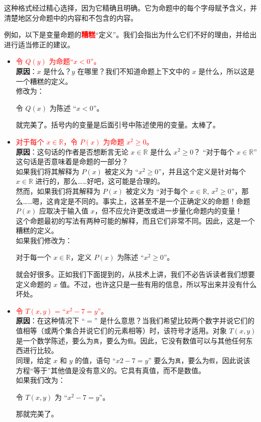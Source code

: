 这种格式经过精心选择，因为它精确且明确。它为命题中的每个字母赋予含义，并清楚地区分命题中的内容和不包含的内容。

例如，以下是变量命题的\textcolor{red}{\textbf{糟糕}}``定义''。我们会指出为什么它们不好的理由，并给出进行适当修正的建议。
\begin{itemize}
    \item \textcolor{red}{令 $Q(y)$ 为命题``$x < 0$''。}\\
        \textbf{原因}：$x$ 是什么？$y$ 在哪里？我们不知道命题上下文中的 $x$ 是什么，所以这是一个糟糕的定义。\\
        修改为：
        \begin{center}
            \textcolor{olivegreen}{令 $Q(x)$ 为陈述 ``$x<0$''。}
        \end{center}
        就完美了。括号内的变量是后面引号中陈述使用的变量。太棒了。
    \item \textcolor{red}{对于每个 $x \in \mathbb{R}$，令 $P(x)$ 为命题 $x^2 \ge 0$。}\\
        \textbf{原因}：这句话的作者是否想断言无论 $x \in \mathbb{R}$ 是什么 $x^2 \ge 0$？ ``对于每个 $x \in \mathbb{R}$'' 这句话是否意味着是命题的一部分？\\
        如果我们将其解释为 $P(x)$ 被定义为 ``$x^2 \ge 0$''，并且这个定义是针对每个 $x \in \mathbb{R}$ 进行的，那么……好吧，这可能是合理的。\\
        然而，如果我们将其解释为 $P(x)$ 被定义为 ``对于每个 $x \in \mathbb{R}$, $x^2 \ge 0$''，那么……嗯，这肯定是不同的。事实上，这甚至不是一个正确定义的命题！命题 $P(x)$ 应取决于输入值 $x$，但不应允许更改或进一步量化命题内的变量！\\
        这个命题最初的写法有两种可能的解释，而且它们非常不同。因此，这是一个糟糕的定义。\\
        如果我们修改为：
        \begin{center}
            \textcolor{olivegreen}{对于每一个 $x \in \mathbb{R}$，定义 $P(x)$ 为陈述 ``$x^2 \ge 0$''。}
        \end{center}
        就会好很多。正如我们下面提到的，从技术上讲，我们不必告诉读者我们想要定义命题的 $x$ 值。不过，也许这只是一些有用的信息，所以写出来并没有什么坏处。
    \item \textcolor{red}{令 $T(x, y)$ = ``$x^2 - 7 = y$''。}\\
        \textbf{原因}：在这种情况下 ``$=$'' 是什么意思？当我们希望比较两个数字并说它们的值相等（或两个集合并说它们的元素相等）时，该符号才适用。对象 $T(x, y)$ 是一个数学陈述，要么为\verb|真|，要么为\verb|假|。因此，它没有数值可以与其他任何东西进行比较。\\
        同理，给定 $x$ 和 $y$ 的值，语句 ``$x2 - 7 = y$'' 要么为\verb|真|，要么为\verb|假|，因此说该方程``等于''其他值是没有意义的。它具有真值，而不是数值。\\
        如果我们改为：
        \begin{center}
            \textcolor{olivegreen}{令 $T(x, y)$ 为 ``$x^2 - 7 = y$''。}
        \end{center}
        那就完美了。
\end{itemize}

